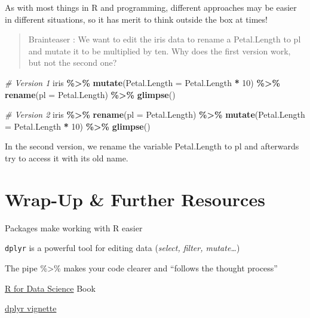 \documentclass[
]{book}
\newenvironment{Shaded}{\begin{snugshade}}{\end{snugshade}}
\newcommand{\AttributeTok}[1]{\textcolor[rgb]{0.13,0.29,0.53}{#1}}
\newcommand{\CommentTok}[1]{\textcolor[rgb]{0.56,0.35,0.01}{\textit{#1}}}
\newcommand{\DecValTok}[1]{\textcolor[rgb]{0.00,0.00,0.81}{#1}}
\newcommand{\FunctionTok}[1]{\textcolor[rgb]{0.13,0.29,0.53}{\textbf{#1}}}
\newcommand{\NormalTok}[1]{#1}
\newcommand{\SpecialCharTok}[1]{\textcolor[rgb]{0.81,0.36,0.00}{\textbf{#1}}}
\begin{document}
As with most things in R and programming, different approaches may be easier in different situations, so it has merit to think outside the box at times!

\begin{quote}
Brainteaser :
We want to edit the iris data to rename a Petal.Length to pl and mutate it to be multiplied by ten.
Why does the first version work, but not the second one?
\end{quote}

\begin{Shaded}
\begin{Highlighting}[]
\CommentTok{\# Version 1}
\NormalTok{iris }\SpecialCharTok{\%\textgreater{}\%} 
  \FunctionTok{mutate}\NormalTok{(}\AttributeTok{Petal.Length =}\NormalTok{ Petal.Length }\SpecialCharTok{*} \DecValTok{10}\NormalTok{) }\SpecialCharTok{\%\textgreater{}\%} 
  \FunctionTok{rename}\NormalTok{(}\AttributeTok{pl =}\NormalTok{ Petal.Length) }\SpecialCharTok{\%\textgreater{}\%} 
  \FunctionTok{glimpse}\NormalTok{()}

\CommentTok{\# Version 2}
\NormalTok{iris }\SpecialCharTok{\%\textgreater{}\%} 
  \FunctionTok{rename}\NormalTok{(}\AttributeTok{pl =}\NormalTok{ Petal.Length) }\SpecialCharTok{\%\textgreater{}\%} 
  \FunctionTok{mutate}\NormalTok{(}\AttributeTok{Petal.Length =}\NormalTok{ Petal.Length }\SpecialCharTok{*} \DecValTok{10}\NormalTok{) }\SpecialCharTok{\%\textgreater{}\%} 
  \FunctionTok{glimpse}\NormalTok{()}
\end{Highlighting}
\end{Shaded}

In the second version, we rename the variable Petal.Length to pl and afterwards try to access it with its old name.

\section*{Wrap-Up \& Further Resources}\label{wrapupdplyr}

Packages make working with R easier

\texttt{dplyr} is a powerful tool for editing data (\emph{select, filter, mutate\ldots{}})

The pipe \%\textgreater\% makes your code clearer and ``follows the thought process''

\href{https://r4ds.hadley.nz/}{R for Data Science} Book

\href{https://dplyr.tidyverse.org/}{dplyr vignette}
\end{document}
